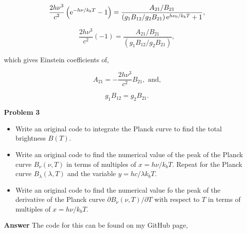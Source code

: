 \documentclass[12pt]{article}
\begin{document}
\begin{itemize}
\begin{equation}
\frac{2h\nu^3}{c^2}\left({\rm e}^{-h\nu/k_bT} - 1 \right) = \frac{A_{21}/B_{21}}{\left(g_1B_{12}/g_2B_{21}\right){\rm e}^{h\nu_0/k_bT} + 1},
\end{equation}

\begin{equation}
\frac{2h\nu^3}{c^2}\left(- 1 \right) = \frac{A_{21}/B_{21}}{\left(g_1B_{12}/g_2B_{21}\right)},
\end{equation}

\noindent which gives Einstein coefficients of, 

\begin{equation}
A_{21} = - \frac{2h\nu^3}{c^2}B_{21}, \text{ and,}
\end{equation}

\begin{equation}
g_1B_{12} = g_2B_{21}.
\end{equation}

\end{itemize}

\noindent \textbf{Problem 3}

\begin{itemize}
\item Write an original code to integrate the Planck curve to find the total brightness $B\left(T\right)$.

\item Write an original code to find the numerical value of the peak of the Planck curve $B_\nu(\nu, T)$ in terms of multiples of $x=h\nu/k_bT$. Repeat for the Planck curve $B_\lambda(\lambda, T)$ and the variable $y=hc/\lambda k_bT$.

\item Write an original code to find the numerical value fo the peak of the derivative of the Planck curve $\partial B_\nu\left(\nu, T\right)/\partial T$ with respect to $T$ in terms of multiples of $x = h\nu/k_bT$.
\end{itemize}

\noindent \textbf{Answer} The code for this can be found on my GitHub page, \url{}
\end{document}

